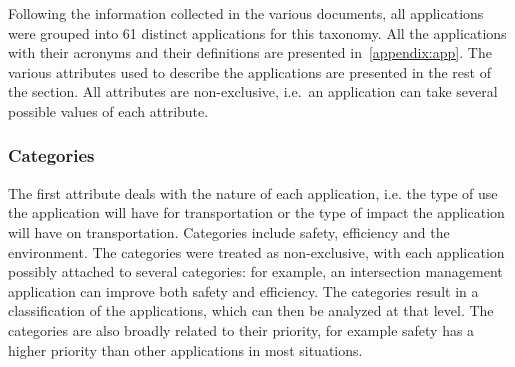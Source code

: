 Following the information collected in the various documents, all applications were grouped into 61 distinct applications for this taxonomy. All the applications with their acronyms and their definitions are presented in~\ref{appendix:app}. 
The various attributes used to describe the applications are presented in the rest of the section. All attributes are non-exclusive, i.e.\ an application can take several possible values of each attribute. 


\subsubsection{Categories}
The first attribute deals with the nature of each application, i.e. the type of use the application will have for transportation or the type of impact the application will have on transportation. Categories include safety, efficiency and the environment. The categories were treated as non-exclusive, with each application possibly attached to several categories: for example, an intersection management application can improve both safety and efficiency. The categories result in a classification of the applications, which can then be analyzed at that level. The categories are also broadly related to their priority, for example safety has a higher priority than other applications in most situations. 





